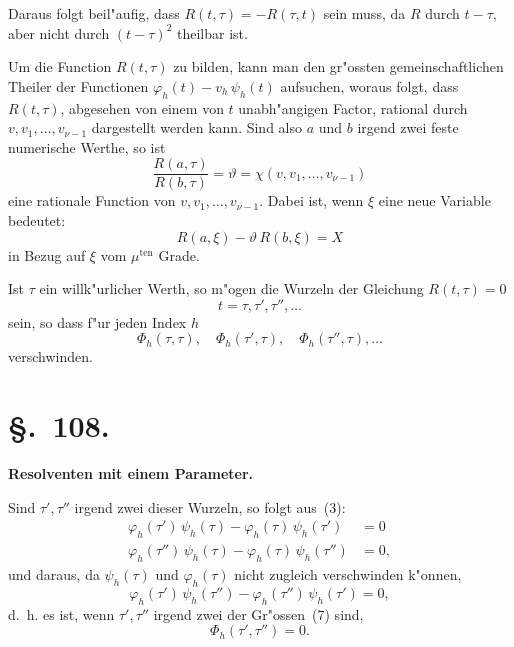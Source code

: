 \documentclass[12pt,a4paper]{article}
\theoremstyle{plain}
\begin{document}
Daraus folgt beil"aufig, dass $R(t,\tau) = -R(\tau,t)$ sein muss, da $R$ durch $t-\tau$, aber nicht durch $(t-\tau)^2$ theilbar ist.

Um die Function $R(t,\tau)$ zu bilden, kann man den gr"ossten gemeinschaftlichen Theiler der Functionen $\varphi_h(t) - v_h\,\psi_h(t)$ aufsuchen, woraus folgt, dass $R(t,\tau)$, abgesehen von einem von $t$ unabh"angigen Factor, rational durch $v, v_1, \ldots, v_{\nu-1}$ dargestellt werden kann. Sind also $a$ und $b$ irgend zwei feste numerische Werthe, so ist
\begin{equation}\tag{5}
\frac{R(a,\tau)}{R(b,\tau)} = \vartheta = \chi(v, v_1, \ldots, v_{\nu-1})
\end{equation}
eine rationale Function von $v, v_1, \ldots, v_{\nu-1}$. Dabei ist, wenn $\xi$ eine neue Variable bedeutet:
\begin{equation}\tag{6}
R(a,\xi) - \vartheta\,R(b,\xi) = X
\end{equation}
in Bezug auf $\xi$ vom $\mu^{\text{ten}}$ Grade.

Ist $\tau$ ein willk"urlicher Werth, so m"ogen die Wurzeln der Gleichung $R(t,\tau)=0$
\begin{equation}\tag{7}
t = \tau, \tau', \tau'', \ldots
\end{equation}
sein, so dass f"ur jeden Index $h$
\[\varPhi_h(\tau,\tau), \quad \varPhi_h(\tau',\tau), \quad \varPhi_h(\tau'',\tau), \ldots\]
verschwinden.



\section*{\S.~108.}
\begin{center}
\large\bfseries Resolventen mit einem Parameter.
\end{center}
\vspace{0.5em}

Sind $\tau', \tau''$ irgend zwei dieser Wurzeln, so folgt aus~(3):
\begin{align*}
\varphi_h(\tau')\,\psi_h(\tau) - \varphi_h(\tau)\,\psi_h(\tau') &= 0\\
\varphi_h(\tau'')\,\psi_h(\tau) - \varphi_h(\tau)\,\psi_h(\tau'') &= 0,
\end{align*}
und daraus, da $\psi_h(\tau)$ und $\varphi_h(\tau)$ nicht zugleich verschwinden k"onnen,
\[\varphi_h(\tau')\,\psi_h(\tau'') - \varphi_h(\tau'')\,\psi_h(\tau') = 0,\]
d.~h. es ist, wenn $\tau', \tau''$ irgend zwei der Gr"ossen~(7) sind,
\[\varPhi_h(\tau',\tau'') = 0.\]
\end{document}
